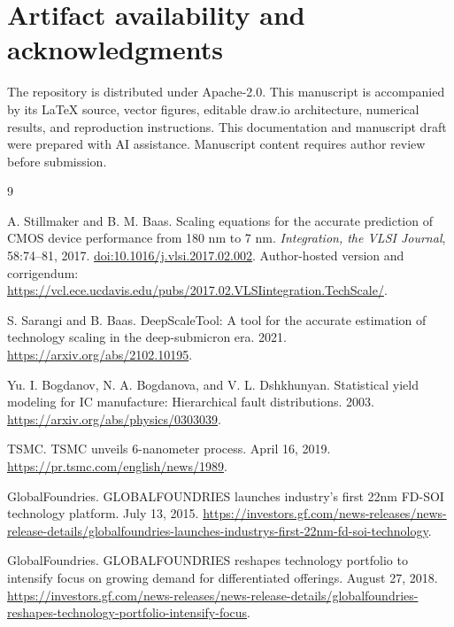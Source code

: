 \documentclass[11pt,a4paper]{article}
\begin{document}
\section*{Artifact availability and acknowledgments}
The repository is distributed under Apache-2.0. This manuscript is accompanied
by its LaTeX source, vector figures, editable draw.io architecture, numerical
results, and reproduction instructions. This documentation and manuscript
draft were prepared with AI assistance. Manuscript content requires author
review before submission.

\begin{thebibliography}{9}
\raggedright
{}
A. Stillmaker and B. M. Baas.
Scaling equations for the accurate prediction of CMOS device performance
from 180 nm to 7 nm.
\emph{Integration, the VLSI Journal}, 58:74--81, 2017.
\href{https://doi.org/10.1016/j.vlsi.2017.02.002}{doi:10.1016/j.vlsi.2017.02.002}.
Author-hosted version and corrigendum:
\url{https://vcl.ece.ucdavis.edu/pubs/2017.02.VLSIintegration.TechScale/}.

S. Sarangi and B. Baas.
DeepScaleTool: A tool for the accurate estimation of technology scaling
in the deep-submicron era. 2021.
\url{https://arxiv.org/abs/2102.10195}.

Yu. I. Bogdanov, N. A. Bogdanova, and V. L. Dshkhunyan.
Statistical yield modeling for IC manufacture: Hierarchical fault
distributions. 2003.
\url{https://arxiv.org/abs/physics/0303039}.

TSMC. TSMC unveils 6-nanometer process. April 16, 2019.
\url{https://pr.tsmc.com/english/news/1989}.

GlobalFoundries.
GLOBALFOUNDRIES launches industry's first 22nm FD-SOI technology platform.
July 13, 2015.
\url{https://investors.gf.com/news-releases/news-release-details/globalfoundries-launches-industrys-first-22nm-fd-soi-technology}.

GlobalFoundries.
GLOBALFOUNDRIES reshapes technology portfolio to intensify focus on growing
demand for differentiated offerings. August 27, 2018.
\url{https://investors.gf.com/news-releases/news-release-details/globalfoundries-reshapes-technology-portfolio-intensify-focus}.
\end{thebibliography}
\end{document}
